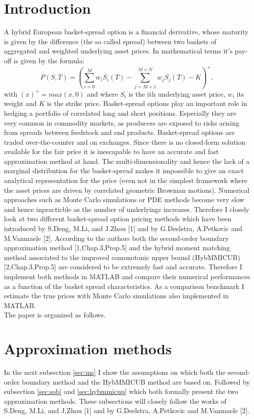 \documentclass[a4paper]{article}
\begin{document}
\section{Introduction}
A hybrid European basket-spread option is a financial derivative, whose
maturity is given by the difference (the so called spread) between two 
baskets of aggregated and weighted underlying asset prices. In mathematical terms it's pay-off is given by 
the formula:
\begin{equation}
\label{eq:po}
P(S,T) = (\sum_{i=0}^M w_iS_i(T) - \sum_{j=M+1}^{M+N} w_jS_j(T) - K)^+,
\end{equation}
with $(x)^+=max(x,0)$ and where $S_i$ is the ith underlying asset price, $w_i$ its weight and $K$ is the strike price.
Basket-spread options play an important role in hedging a portfolio of correlated long and short
positions. Especially they are very common in commodity markets,
as producers are exposed to risks arising from spreads between feedstock and end products.
Basket-spread options are traded over-the-counter and on exchanges. Since there is no
closed-form solution available for the fair price it is inescapable to have an accurate and
fast approximation method at hand. The multi-dimensionality and
hence the lack of a marginal distribution for the basket-spread makes it impossible to give an exact
analytical representation for the price (even not in the simplest framework
where the asset prices are driven by  correlated geometric Brownian motions). Numerical approaches such 
as Monte Carlo simulations or PDE methods become very slow and hence inpracticble as the number of underlyings increases. 
Therefore I closely look at two different basket-spread option pricing methods which have been 
introduced by S.Deng, M.Li, and J.Zhou [1] and by G.Deelstra, A.Petkovic and M.Vanmaele [2]. According to the authors both the second-order
boundary approximation method [1,Chap.3,Prop.5] and the hybrid moment matching method associated to the improved comonotonic upper bound (HybMMICUB)
[2,Chap.3,Prop.5] are considered to be extremely fast and accurate. Therefore I implement both methods in MATLAB
and compare their numerical performances as a function of the basket spread characteristics. 
As a comparison benchmark I estimate the true prices with Monte Carlo simulations also implemented in MATLAB.\\
The paper is organized as follows.

\newpage
\section{Approximation methods}
\label{sec:am}
In the next subsection \ref{sec:ms} I show the assumptions on which both the second-order boundary method and the HybMMICUB method are based on. Followed by subsection \ref{sec:sob} and \ref{sec:hybmmicup} which both formally present the two approximation methods. These subsections will closely follow the works of S.Deng, M.Li, and J.Zhou [1] and by G.Deelstra, A.Petkovic and M.Vanmaele [2].
\end{document}
